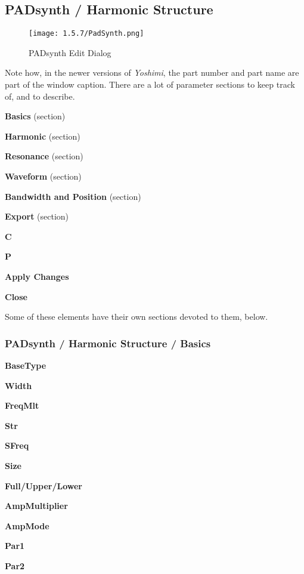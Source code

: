 \subsection{PADsynth / Harmonic Structure}
\label{subsec:padsynth_harmonic_structure}

\begin{figure}[H]
   \centering
   \texttt{[image: 1.5.7/PadSynth.png]}
   \caption{PADsynth Edit Dialog}
   \label{fig:padsynth_edit_dialog}
\end{figure}

   Note how, in the newer versions of \textsl{Yoshimi}, the
   part number and part name are part of the window caption.
   There are a lot of parameter sections to keep track of, and to describe.

   \begin{enumber}
      \item \textbf{Basics} (section)
      \item \textbf{Harmonic} (section)
      \item \textbf{Resonance} (section)
      \item \textbf{Waveform} (section)
      \item \textbf{Bandwidth and Position} (section)
      \item \textbf{Export} (section)
      \item \textbf{C}
      \item \textbf{P}
      \item \textbf{Apply Changes}
      \item \textbf{Close}
   \end{enumber}

   Some of these elements have their own sections devoted to them, below.

\subsubsection{PADsynth / Harmonic Structure / Basics}
\label{subsubsec:padsynth_harmonic_structure_basics}

   \begin{enumber}
      \item \textbf{BaseType}
      \item \textbf{Width}
      \item \textbf{FreqMlt}
      \item \textbf{Str}
      \item \textbf{SFreq}
      \item \textbf{Size}
      \item \textbf{Full/Upper/Lower}
      \item \textbf{AmpMultiplier}
      \item \textbf{AmpMode}
      \item \textbf{Par1}
      \item \textbf{Par2}
   \end{enumber}


